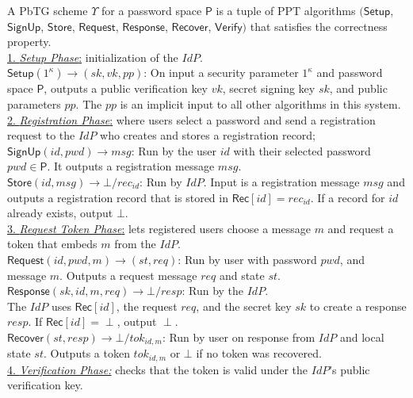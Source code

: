\documentclass[conference]{IEEEtran}
\newcommand{\secparameter}{\kappa}
\newcommand{\pwd}{pwd}
\newcommand{\sk}{sk}
\newcommand{\vk}{vk}
\newcommand{\pp}{pp}
\newcommand{\uid}{id}
\newcommand{\sP}{\mathsf{P}}
\begin{document}
\label{def:PbTG}
A PbTG scheme $\Upsilon$ for a password space $\mathsf{P}$ is a tuple of PPT algorithms $(\mathsf{Setup}$, $\mathsf{SignUp}$, $\mathsf{Store}$, $\mathsf{Request}$, $\mathsf{Response}$, $\mathsf{Recover}$, $\mathsf{Verify})$ that satisfies the correctness property.
\\
\noindent \underline{1. {\em Setup Phase}:} initialization of the $IdP$.\\
$\mathsf{Setup}(1^{\secparameter}) \rightarrow (\sk,\vk,\pp)$: On input a security parameter $1^{\secparameter}$ and password space $\mathsf{P}$, outputs a public verification key $\vk$, secret signing key $\sk$, and public parameters $\pp$. The $\pp$ is an implicit input to all other algorithms in this system.\\
\noindent \underline{2. {\em Registration Phase}:} where users select a password and send a registration request to the $IdP$ who creates and stores a registration record;\\
\noindent $\mathsf{SignUp}(\uid,\pwd) \rightarrow msg$: Run by the user $\uid$ with their selected password $\pwd \in \sP$. It outputs a registration message $msg$.\\
\noindent $\mathsf{Store}(\uid,msg) \rightarrow \bot / rec_{\uid}$: Run by $IdP$. Input is a registration message $msg$ and outputs a registration record that is stored in $\mathsf{Rec}[\uid] = rec_{\uid}$. If a record for $\uid$ already exists, output $\bot$.\\
\noindent \underline{3. {\em Request Token Phase}:} lets registered users choose a message $m$ and request a token that embeds $m$ from the $IdP$.\\
\noindent $\mathsf{Request}(\uid,\pwd,m) \rightarrow (st, req)$: Run by user with password $\pwd$, and message $m$. Outputs a request message $req$ and state $st$.\\      
\noindent $\mathsf{Response}(\sk, \uid, m, req) \rightarrow \bot / resp$: Run by the $IdP$.\\
The $IdP$ uses $\mathsf{Rec}[\uid]$, the request $req$, and the secret key $\sk$ to create a response $resp$. If $\mathsf{Rec}[\uid] = \perp$, output $\perp$.\\
\noindent $\mathsf{Recover}(st, resp) \rightarrow \bot / tok_{\uid,m}$: Run by user on response from $IdP$ and local state $st$. Outputs a token $tok_{\uid,m}$ or $\bot$ if no token was recovered.\\
\noindent \underline{4. {\em Verification Phase:}} checks that the token is valid under the $IdP$'s public verification key.\\
\end{document}
